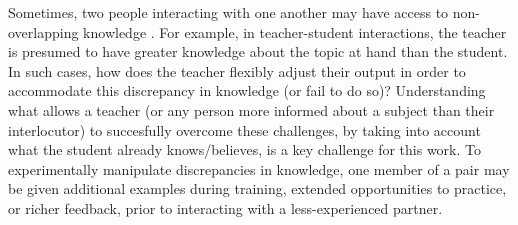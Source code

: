 \documentclass[12pt]{article}
\begin{document}
Sometimes, two people interacting with one another may have access to non-overlapping knowledge \cite{Wu:2007tz}. For example, in teacher-student interactions, the teacher is presumed to have greater knowledge about the topic at hand than the student. In such cases, how does the teacher flexibly adjust their output in order to accommodate this discrepancy in knowledge (or fail to do so)? Understanding what allows a teacher (or any person more informed about a subject than their interlocutor) to succesfully overcome these challenges, by taking into account what the student already knows/believes, is a key challenge for this work. To experimentally manipulate discrepancies in knowledge, one member of a pair may be given additional examples during training, extended opportunities to practice, or richer feedback, prior to interacting with a less-experienced partner. 


\setlength{\bibleftmargin}{.125in}
\setlength{\bibindent}{-\bibleftmargin}

\end{document}
